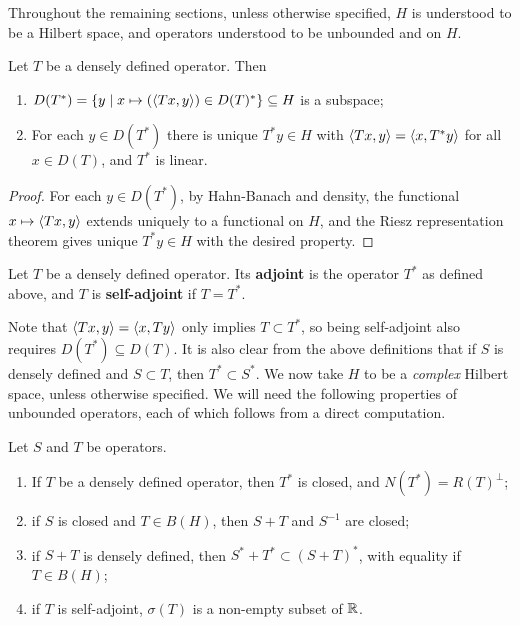 \documentclass[10pt]{amsart}
\begin{document}
Throughout the remaining sections, unless otherwise specified, $H$ is understood to be a Hilbert space, and operators understood to be unbounded and on $H$. %
\begin{lemma}
    Let $T$ be a densely defined operator. Then
    \begin{enumerate}
        \item $D(T^*) = \left\{  y \mid x \mapsto (\left\langle Tx, y \right\rangle) \in D(T)^*  \right\} \subseteq H$ is a subspace;
        \item For each $y \in D(T^*)$ there is unique $T^*y \in H$ with $\left\langle Tx, y \right\rangle = \left\langle x, T^*y \right\rangle$ for all $x \in D(T)$, and $T^*$ is linear.
    \end{enumerate}
\end{lemma}
\begin{proof}
    For each $y \in D(T^*)$, by Hahn-Banach and density, the functional $x \mapsto \left\langle Tx, y \right\rangle$ extends uniquely to a functional on $H$, and the Riesz representation theorem gives unique $T^*y \in H$ with the desired property.
\end{proof}
\begin{definition}
    Let $T$ be a densely defined operator. Its \textbf{adjoint} is the operator $T^*$ as defined above, and $T$ is \textbf{self-adjoint} if $T = T^*$.
\end{definition}
Note that $\left\langle Tx, y \right\rangle = \left\langle x, Ty \right\rangle$ only implies $T \subset T^*$, so being self-adjoint also requires $D(T^*) \subseteq D(T)$. It is also clear from the above definitions that if $S$ is densely defined and $S \subset T$, then $T^* \subset S^*$. We now take $H$ to be a \emph{complex} Hilbert space, unless otherwise specified. We will need the following properties of unbounded operators, each of which follows from a direct computation.
\begin{proposition}\label{adjclosed}
    Let $S$ and $T$ be operators. 
    \begin{enumerate}
        \item If $T$ be a densely defined operator, then $T^*$ is closed, and $N(T^*) = R(T)^\perp$;
        \item if $S$ is closed and $T \in B(H)$, then $S + T$ and $S^{-1}$ are closed;
        \item if $S + T$ is densely defined, then $S^* + T^* \subset (S + T)^*$, with equality if $T \in B(H)$;
        \item if $T$ is self-adjoint, $\sigma(T)$ is a non-empty subset of $\mathbb{R}$.
    \end{enumerate}
\end{proposition}
\end{document}

